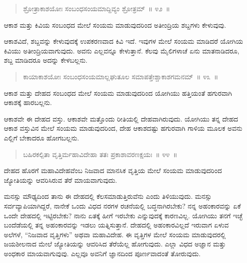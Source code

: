 \vspace{-0.3cm}

\begin{verse}
ಶ್ರೋತ್ರಾಕಾಶಯೋಃ ಸಂಬಂಧಸಂಯಮಾದ್ದಿವ್ಯಂ ಶ್ರೋತ್ರಮ್​~॥ ೪೨~॥
\end{verse}

\vspace{-0.3cm}

ಆಕಾಶ ಮತ್ತು ಕಿವಿಯ ಸಂಬಂಧದ ಮೇಲೆ ಸಂಯಮ ಮಾಡುವುದರಿಂದ ಅತೀಂದ್ರಿಯ ಶಬ್ದಗಳು ಕೇಳುವುವು. 

ಆಕಾಶವಿದೆ, ಶಬ್ದವನ್ನು ಕೇಳುವುದಕ್ಕೆ ಉಪಕರಣವಾದ ಕಿವಿ ಇದೆ. ಇವುಗಳ ಮೇಲೆ ಸಂಯಮ ಮಾಡಿದರೆ ಯೋಗಿಯ ಕಿವಿಯು ಅತೀಂದ್ರಿಯವಾಗುವುದು. ಅವನು ಎಲ್ಲವನ್ನೂ ಕೇಳುತ್ತಾನೆ. ಕೆಲವು ಮೈಲಿಗಳಾಚೆ ಏನು ಮಾತನಾಡಿದರೂ, ಶಬ್ದ ಮಾಡಿದರೂ ಅದನ್ನು ಕೇಳಬಲ್ಲನು. 

\vspace{-0.3cm}

\begin{verse}
ಕಾಯಾಕಾಶಯೋಃ ಸಂಬಂಧಸಂಯಮಾಲ್ಲಘುತೂಲ ಸಮಾಪತ್ತೇಶ್ಚಾಕಾಶಗಮನಮ್​~॥ ೪೩~॥
\end{verse}

\vspace{-0.3cm}

ಆಕಾಶ ಮತ್ತು ದೇಹದ ಸಂಬಂಧದ ಮೇಲೆ ಸಂಯಮ ಮಾಡುವುದರಿಂದ ಯೋಗಿಯು ಹತ್ತಿಯಂತೆ ಹಗುರವಾಗಿ ಆಕಾಶಕ್ಕೆ ಹಾರಬಲ್ಲನು. 

ಆಕಾಶವೇ ಈ ದೇಹದ ವಸ್ತು. ಆಕಾಶವೇ ಮತ್ತೊಂದು ರೀತಿಯಲ್ಲಿ ದೇಹವಾಗಿರುವುದು. ಯೋಗಿಯು ತನ್ನ ದೇಹದ ಆಕಾಶ ವಸ್ತುವಿನ ಮೇಲೆ ಸಂಯಮ ಮಾಡುವುದರಿಂದ, ದೇಹ ಆಕಾಶದಷ್ಟು ಹಗುರವಾಗಿ ಗಾಳಿಯ ಮೂಲಕ ಅವನು ಎಲ್ಲಿಗೆ ಬೇಕಾದರೂ ಹೋಗಬಲ್ಲನು. 

\vspace{-0.3cm}

\begin{verse}
ಬಹಿರಕಲ್ಪಿತಾ ವೃತ್ತಿರ್ಮಹಾವಿದೇಹಾ ತತಃ ಪ್ರಕಾಶಾವರಣಕ್ಷಯಃ~॥ ೪೪~॥
\end{verse}

\vspace{-0.3cm}

ದೇಹದ ಹೊರಗೆ ಮಹಾವಿದೇಹವೆಂಬ ನಿಜವಾದ ಮಾನಸಿಕ ವೃತ್ತಿಯ ಮೇಲೆ ಸಂಯಮ ಮಾಡುವುದರಿಂದ ಜ್ಯೋತಿಯನ್ನು ಆವರಿಸಿರುವ ತೆರೆ ಮಾಯವಾಗುವುದು. 

ಮನಸ್ಸು ಮೌಢ್ಯದಿಂದ ತಾನು ಈ ದೇಹದಲ್ಲಿ ಕೆಲಸಮಾಡುತ್ತಿರುವೆನು ಎಂದು ತಿಳಿಯುವುದು. ಮನಸ್ಸು ಸರ್ವವ್ಯಾಪಿಯಾಗಿದ್ದರೆ, ನಾನೇಕೆ ಒಂದು ವಿಧದ ನರಗಳ ರಚನೆಯಲ್ಲಿ ಬದ್ಧನಾಗಿರಬೇಕು? ನನ್ನ ಅಹಂಕಾರವನ್ನು ಏಕೆ ಒಂದೇ ದೇಹದಲ್ಲಿ ಇಟ್ಟಿರಬೇಕು? ನಾನು ಏತಕ್ಕೆ ಹೀಗೆ ಇರಬೇಕು ಎನ್ನುವುದಕ್ಕೆ ಕಾರಣವಿಲ್ಲ. ಯೋಗಿಯು ತನಗೆ ಇಚ್ಛೆ ಬಂದೆಡೆಯಲ್ಲಿ ತನ್ನ ಅಹಂಕಾರವನ್ನು ಇಡಲು ಯತ್ನಿಸುತ್ತಾನೆ. ದೇಹದಲ್ಲಿ ಅಹಂಕಾರವಿಲ್ಲದೆ ಇರುವಾಗ ಏಳುವ ಅಲೆಗಳೆ, “ನಿಜವಾದ ವೃತ್ತಿಗಳು” ಅಥವಾ ಮಹಾವಿದೇಹ. ಈ ವೃತ್ತಿಗಳ ಮೇಲೆ ಸಂಯಮ ಮಾಡುವುದರಲ್ಲಿ ಜಯಶೀಲನಾದ ಮೇಲೆ ಜ್ಯೋತಿಯನ್ನು ಆವರಿಸಿದ ತೆರೆಯೆಲ್ಲ ಹೋಗುವುದು. ಎಲ್ಲಾ ವಿಧದ ಅಜ್ಞಾನ ಮತ್ತು ಅಂಧಕಾರ ಮಾಯವಾಗುವುವು. ಎಲ್ಲವೂ ಅವನಿಗೆ ಜ್ಞಾನದಿಂದ ಪೂರ್ಣವಾದಂತೆ ತೋರುವುದು. 

